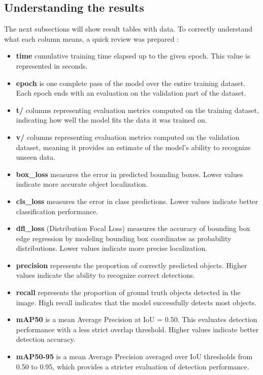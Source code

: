 \subsection{Understanding the results}
The next subsections will show result tables with data. To correctly understand what each column means, a quick review was prepared \cite{ultralyticsResults}:

\begin{itemize}
    \item {\textbf{time} cumulative training time elapsed up to the given epoch. This value is represented in seconds.}
    \item {\textbf{epoch} is one complete pass of the model over the entire training dataset. Each epoch ends with an evaluation on the validation part of the dataset.}
    \item {\textbf{t/} columns representing evaluation metrics computed on the training dataset, indicating how well the model fits the data it was trained on.}
    \item {\textbf{v/} columns representing evaluation metrics computed on the validation dataset, meaning it provides an estimate of the model's ability to recognize unseen data.}
    \item {\textbf{box\_loss} measures the error in predicted bounding boxes. Lower values indicate more accurate object localization.}
    \item {\textbf{cls\_loss} measures the error in class predictions. Lower values indicate better classification performance.}
    \item {\textbf{dfl\_loss} (Distribution Focal Loss) measures the accuracy of bounding box edge regression by modeling bounding box coordinates as probability distributions. Lower values indicate more precise localization.}
    \item {\textbf{precision} represents the proportion of correctly predicted objects. Higher values indicate the ability to recognize correct detections.}
    \item {\textbf{recall} represents the proportion of ground truth objects detected in the image. High recall indicates that the model successfully detects most objects.}
    \item {\textbf{mAP50} is a mean Average Precision at IoU = 0.50. This evaluates detection performance with a less strict overlap threshold. Higher values indicate better detection accuracy.}
    \item {\textbf{mAP50-95} is a mean Average Precision averaged over IoU thresholds from 0.50 to 0.95, which provides a stricter evaluation of detection performance.}
\end{itemize}

